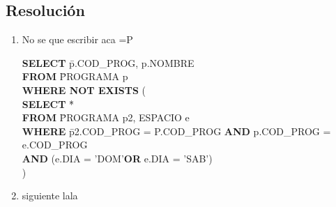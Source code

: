 \documentclass[a4paper,10pt]{article}
\begin{document}
\subsection*{Resoluci\'on}

\begin{enumerate}


 \item No se que escribir aca =P
\begin{tabbing}
 \textbf{SELECT} \= p.COD\_PROG, p.NOMBRE\\
 \textbf{FROM} \=PROGRAMA p\\
 \textbf{WHERE NOT EXISTS} (\\
 \> \textbf{SELECT} \= *\\
 \>  \textbf{FROM} \= PROGRAMA p2, ESPACIO e\\
 \>   \textbf{WHERE} \= p2.COD\_PROG = P.COD\_PROG \textbf{AND} p.COD\_PROG = e.COD\_PROG \\ \>   \=\textbf{AND} (e.DIA = 'DOM'\textbf{OR} e.DIA = 'SAB') \\)\\

\end{tabbing}

 \item siguiente
lala

\end{enumerate}
\end{document}
